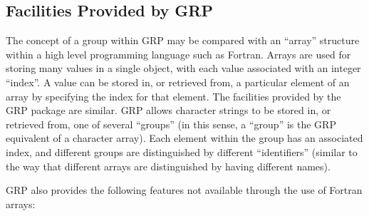 \subsection{\label{SEC:FAC}Facilities Provided by GRP}
The concept of a group within GRP may be compared with an ``array'' structure
within a high level programming language such as Fortran. Arrays are used for
storing many values in a single object, with each value associated with an
integer ``index''. A value can be stored in, or retrieved from, a particular
element of an array by specifying the index for that element. The facilities
provided by the GRP package are similar. GRP allows character strings to be
stored in, or retrieved from, one of several ``groups'' (in this sense, a
``group'' is the GRP equivalent of a character array). Each element within the
group has an associated index, and different groups are distinguished by
different ``identifiers'' (similar to the way that different arrays are
distinguished by having different names).

GRP also provides the following features not available through the use of
Fortran arrays:

